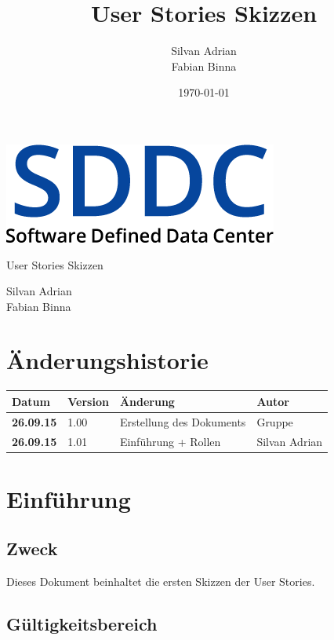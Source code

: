 \documentclass[11pt]{scrartcl}
\title{User Stories Skizzen}
\author{Silvan Adrian \\ Fabian Binna}
\date{\today{}}
\begin{document}
\def\arraystretch{1.5}
\begin{titlepage}
\begin{center}
\vspace{10em}
\includegraphics[scale=2]{SDDC}
\vspace{10em}
\end{center}
\begin{center}
\huge {User Stories Skizzen}
\end{center}
\begin{center}
\vspace{10em}
\LARGE {Silvan Adrian} \\
\LARGE {Fabian Binna}
\end{center}

\end{titlepage}

\newpage
\section{Änderungshistorie}
\begin{tabularx}{\linewidth}{l l X l}
\textbf{Datum} & \textbf{Version} & \textbf{Änderung}  & \textbf{Autor} \\
\hline
\textbf{26.09.15} & 1.00 & Erstellung des Dokuments & Gruppe \\
\textbf{26.09.15} & 1.01 & Einführung + Rollen & Silvan Adrian \\
\end{tabularx}

\newpage
\tableofcontents
\newpage
\section{Einführung}

\subsection{Zweck}

Dieses Dokument beinhaltet die ersten Skizzen der User Stories.

\subsection{Gültigkeitsbereich}
\end{document}
